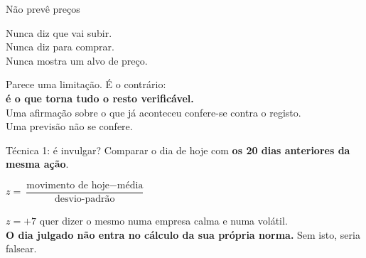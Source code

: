 \documentclass[aspectratio=169]{beamer}
\begin{document}
\begin{frame}{Não prevê preços}
\begin{center}
\Large
Nunca diz que vai subir.\\[2mm]
Nunca diz para comprar.\\[2mm]
Nunca mostra um alvo de preço.
\end{center}
\vspace{6mm}
\begin{center}
\normalsize
Parece uma limitação. É o contrário:\\
\textbf{é o que torna tudo o resto verificável.}\\[2mm]
\footnotesize Uma afirmação sobre o que já aconteceu confere-se contra o registo.\\
Uma previsão não se confere.
\end{center}
\end{frame}

\begin{frame}{Técnica 1: é invulgar?}
Comparar o dia de hoje com \textbf{os 20 dias anteriores da mesma ação}.
\begin{center}
\end{center}
\vspace{1mm}
\begin{center}
$z = \dfrac{\text{movimento de hoje} - \text{média}}{\text{desvio-padrão}}$
\end{center}
\vspace{2mm}
\footnotesize
$z=+7$ quer dizer o mesmo numa empresa calma e numa volátil.\\
\textbf{O dia julgado não entra no cálculo da sua própria norma.} Sem isto, seria falsear.
\end{frame}
\end{document}
